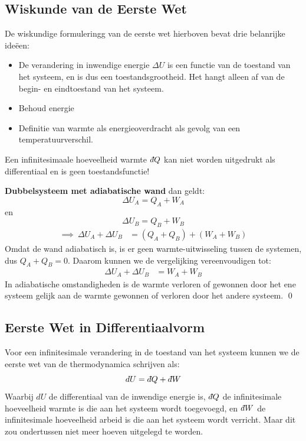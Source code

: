 \subsection{Wiskunde van de Eerste Wet}

De wiskundige formuleringg van de eerste wet hierboven bevat drie belanrijke ideëen:
\begin{itemize}
    \item De verandering in inwendige energie $\Delta U$ is een functie van de toestand van het systeem, en is dus een toestandsgrootheid. Het hangt alleen af van de begin- en eindtoestand van het systeem.
    \item Behoud energie
    \item Definitie van warmte als energieoverdracht als gevolg van een temperatuurverschil.
\end{itemize}
   

Een infinitesimaale hoeveelheid warmte \(\dbar Q\) kan niet worden uitgedrukt als differentiaal en is geen toestandsfunctie!

\begin{derivation}
    \textbf{Dubbelsysteem met adiabatische wand} dan geldt:
    \[ \Delta U_A = Q_A + W_A \] 
    en
    \[ \Delta U_B = Q_B + W_B \]
    \begin{align*}
        \implies \
        \Delta U_A + \Delta U_B &= (Q_A + Q_B) + (W_A + W_B)
    \end{align*}
        Omdat de wand adiabatisch is, is er geen warmte-uitwisseling tussen de systemen, dus \(Q_A + Q_B = 0\). Daarom kunnen we de vergelijking vereenvoudigen tot:
    \begin{align*}
        \Delta U_A + \Delta U_B &= W_A + W_B
    \end{align*}
    In adiabatische omstandigheden is de warmte verloren of gewonnen door het ene systeem gelijk aan de warmte gewonnen of verloren door het andere systeem.
    \qed
\end{derivation}


\subsection{Eerste Wet in Differentiaalvorm}

Voor een infinitesimale verandering in de toestand van het systeem kunnen we de eerste wet van de thermodynamica schrijven als:
\begin{equation}
    dU = \dbar Q + \dbar W
\end{equation}
Waarbij \(dU\) de differentiaal van de inwendige energie is, \(\dbar Q\) de infinitesimale hoeveelheid warmte is die aan het systeem wordt toegevoegd, en \(\dbar W\) de infinitesimale hoeveelheid arbeid is die aan het systeem wordt verricht.
Maar dit zou ondertussen niet meer hoeven uitgelegd te worden.

